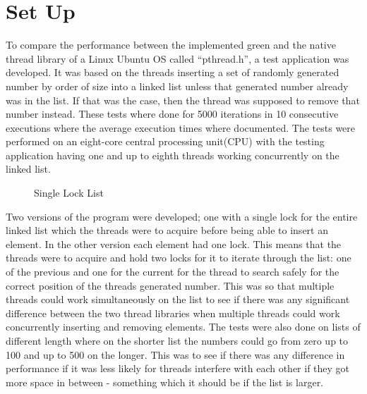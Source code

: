 \documentclass{article}
\begin{document}
\section{Set Up}\label{setup}

To compare the performance between the implemented green and the native thread library of a Linux Ubuntu OS called “pthread.h”, a test application was developed. It was based on the threads inserting a set of randomly generated number by order of size into a linked list unless that generated number already was in the list. If that was the case, then the thread was supposed to remove that number instead. These tests where done for 5000 iterations in 10 consecutive executions where the average execution times where documented. The tests were performed on an eight-core central processing unit(CPU) with the testing application having one and up to eighth threads working concurrently on the linked list. 

\begin{figure}
\hspace{4em}
\caption{Single Lock List}
\end{figure}


Two versions of the program were developed; one with a single lock for the entire linked list which the threads were to acquire before being able to insert an element. In the other version each element had one lock. This means that the threads were to acquire and hold two locks for it to iterate through the list: one of the previous and one for the current for the thread to search safely for the correct position of the threads generated number. This was so that multiple threads could work simultaneously on the list to see if there was any significant difference between the two thread libraries when multiple threads could work concurrently inserting and removing elements. The tests were also done on lists of different length where on the shorter list the numbers could go from zero up to 100 and up to 500 on the longer. This was to see if there was any difference in performance if it was less likely for threads interfere with each other if they got more space in between - something which it should be if the list is larger. 
\end{document}
